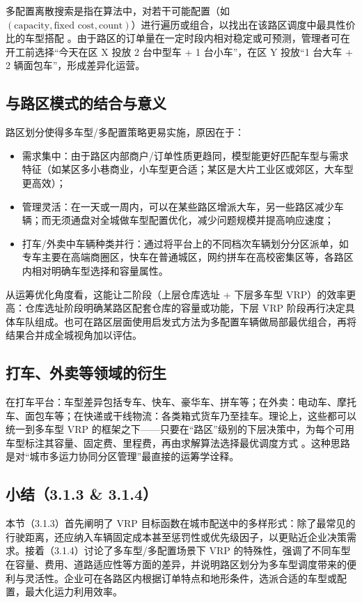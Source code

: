 \documentclass[12pt,a4paper,twoside]{ctexbook}
\begin{document}
多配置离散搜索是指在算法中，对若干可能配置（如 $(\text{capacity}, \text{fixed cost}, \text{count})$）进行遍历或组合，以找出在该路区调度中最具性价比的车型搭配 \cite{salazar2013multi}。由于路区的订单量在一定时段内相对稳定或可预测，管理者可在开工前选择“今天在区 X 投放 2 台中型车 + 1 台小车”，在区 Y 投放“1 台大车 + 2 辆面包车”，形成差异化运营。

\subsection{与路区模式的结合与意义}
路区划分使得多车型/多配置策略更易实施，原因在于：
\begin{itemize}
    \item 需求集中：由于路区内部商户/订单性质更趋同，模型能更好匹配车型与需求特征（如某区多小巷商业，小车型更合适；某区是大片工业区或郊区，大车型更高效）；
    \item 管理灵活：在一天或一周内，可以在某些路区增派大车，另一些路区减少车辆；而无须通盘对全城做车型配置优化，减少问题规模并提高响应速度；
    \item 打车/外卖中车辆种类并行：通过将平台上的不同档次车辆划分分区派单，如专车主要在高端商圈区，快车在普通城区，网约拼车在高校密集区等，各路区内相对明确车型选择和容量属性。
\end{itemize}

从运筹优化角度看，这能让二阶段（上层仓库选址 + 下层多车型 VRP）的效率更高：仓库选址阶段明确某路区配套仓库的容量或功能，下层 VRP 阶段再行决定具体车队组成。也可在路区层面使用启发式方法为多配置车辆做局部最优组合，再将结果合并成全城视角加以评估。

\subsection{打车、外卖等领域的衍生}
在打车平台：车型差异包括专车、快车、豪华车、拼车等；在外卖：电动车、摩托车、面包车等；在快递或干线物流：各类箱式货车乃至挂车。理论上，这些都可以统一到多车型 VRP 的框架之下——只要在“路区”级别的下层决策中，为每个可用车型标注其容量、固定费、里程费，再由求解算法选择最优调度方式 \cite{salazar2013multi}。这种思路是对“城市多运力协同分区管理”最直接的运筹学诠释。

\subsection{小结（3.1.3 \& 3.1.4）}
本节（3.1.3）首先阐明了 VRP 目标函数在城市配送中的多样形式：除了最常见的行驶距离，还应纳入车辆固定成本甚至惩罚性或优先级因子，以更贴近企业决策需求。接着（3.1.4）讨论了多车型/多配置场景下 VRP 的特殊性，强调了不同车型在容量、费用、道路适应性等方面的差异，并说明路区划分为多车型调度带来的便利与灵活性。企业可在各路区内根据订单特点和地形条件，选派合适的车型或配置，最大化运力利用效率。
\end{document}
